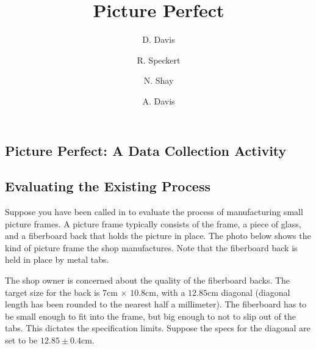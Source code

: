 \documentclass{ximera}
\author{D. Davis \and R. Speckert \and N. Shay \and A. Davis}
\title{Picture Perfect} \license{CC BY-NC-SA 4.0}
\begin{document}
\begin{abstract}
\end{abstract}
\maketitle

\begin{onlineOnly}
\section*{Picture Perfect: A Data Collection Activity}
\end{onlineOnly}

\subsection*{Evaluating the Existing Process}

Suppose you have been called in to evaluate the process of manufacturing small picture frames.  A picture frame typically consists of the frame, a piece of glass, and a fiberboard back that holds the picture in place. The photo below shows the kind of picture frame the shop manufactures. Note that the fiberboard back is held in place by metal tabs.  

\begin{center}
       \end{center}

The shop owner is concerned about the quality of the fiberboard backs.  The target size for the back is $7$cm $\times$ $10.8$cm, with a $12.85$cm diagonal (diagonal length has been rounded to the nearest half a millimeter).  The fiberboard has to be small enough to fit into the frame, but big enough to not to slip out of the tabs.  This dictates the specification limits.  Suppose the specs for the diagonal are set to be $12.85\pm 0.4$cm.
\end{document}
